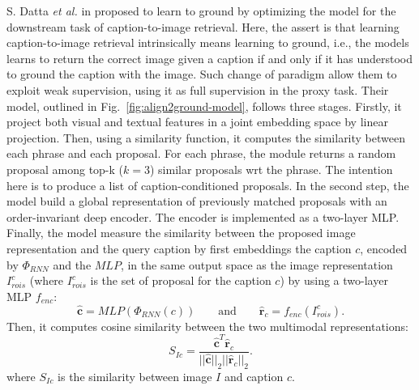 S. Datta \textit{et al.} in \cite{datta2019align2ground} proposed to
learn to ground by optimizing the model for the downstream task of
caption-to-image retrieval. Here, the assert is that learning
caption-to-image retrieval intrinsically means learning to ground,
i.e., the models learns to return the correct image given a caption if
and only if it has understood to ground the caption with the image.
Such change of paradigm allow them to exploit weak supervision, using
it as full supervision in the proxy task. Their model, outlined in
Fig.~\ref{fig:align2ground-model}, follows three stages. Firstly, it
project both visual and textual features in a joint embedding space by
linear projection. Then, using a similarity function, it computes the
similarity between each phrase and each proposal. For each phrase, the
module returns a random proposal among top-k ($k = 3$) similar
proposals wrt the phrase. The intention here is to produce a list of
caption-conditioned proposals. In the second step, the model build a
global representation of previously matched proposals with an
order-invariant deep encoder. The encoder is implemented as a
two-layer MLP. Finally, the model measure the similarity between the
proposed image representation and the query caption by first
embeddings the caption $c$, encoded by $\Phi_{RNN}$ and the $MLP$, in
the same output space as the image representation $I^c_{rois}$ (where
$I^c_{rois}$ is the set of proposal for the caption $c$) by using a
two-layer MLP $f_{enc}$:
\begin{equation}
  \hat{\bm{c}} = MLP (\Phi_{RNN} (c)) \qquad \text{and} \qquad \hat{\bm{r}}_c = f_{enc} (I^c_{rois}).
\end{equation}
Then, it computes cosine similarity between the two multimodal
representations:
\begin{equation}
  S_{Ic} = \frac{ \hat{\bm{c}}^T \hat{\bm{r}}_c }{ || \hat{\bm{c}} ||_2 || \hat{\bm{r}}_c ||_2 }.
\end{equation}
where $S_{Ic}$ is the similarity between image $I$ and caption $c$. 

